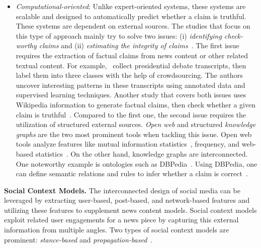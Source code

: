 \begin{description}
\begin{itemize}
        \item \emph{Computational-oriented}: Unlike expert-oriented systems, these systems are scalable and designed to automatically predict whether a claim is truthful. These systems are dependent on external sources. The studies that focus on this type of approach mainly try to solve two issues: (i) \emph{identifying check-worthy claims} and (ii) \emph{estimating the integrity of claims}~\parencite{FakeNewsDetectionOnSocialMediaADataMiningPerspective_Shu}. The first issue requires the extraction of factual claims from news content or other related textual content. For example,~\cite{DetectingCheckWorthyClaims_Hassan} collect presidential debate transcripts, then label them into three classes with the help of crowdsourcing. The authors uncover interesting patterns in these transcripts using annotated data and supervised learning techniques. Another study that covers both issues uses Wikipedia information to generate factual claims, then check whether a given claim is truthful~\parencite{FEVER_Thorne}. Compared to the first one, the second issue requires the utilization of structured external sources. \emph{Open web} and structured \emph{knowledge graphs} are the two most prominent tools when tackling this issue. Open web tools analyze features like mutual information statistics~\parencite{UnsupervisedNamedEntityExtraction_Etzioni}, frequency, and web-based statistics~\parencite{WebBasedStatisticalFactChecking_Magdy}.  On the other hand, knowledge graphs are interconnected. One noteworthy example is ontologies such as DBPedia~\parencite{DBPedia_Auer}. Using DBPedia, one can define semantic relations and rules to infer whether a claim is correct~\parencite{SemanticFakeNewsDetection_Bracsoveanu}.
    \end{itemize}
\end{description}
\textbf{Social Context Models.} The interconnected design of social media can be leveraged by extracting user-based, post-based, and network-based features and utilizing these features to supplement news content models. Social context models exploit related user engagements for a news piece by capturing this external information from multiple angles. Two types of social context models are prominent: \emph{stance-based} and \emph{propagation-based}~\parencite{FakeNewsDetectionOnSocialMediaADataMiningPerspective_Shu}.
